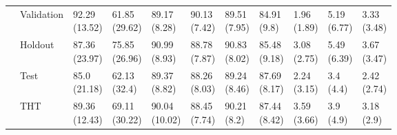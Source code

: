 \begin{table}
\begin{tabular}{lllllllllll}
       & Validation &  \makecell{92.29\\(13.52)} &  \makecell{61.85\\(29.62)} &   \makecell{89.17\\(8.28)} &  \makecell{90.13\\(7.42)} &  \makecell{89.51\\(7.95)} &   \makecell{84.91\\(9.8)} &      \makecell{1.96\\(1.89)} &  \makecell{5.19\\(6.77)} &  \makecell{3.33\\(3.48)} \\
       & Holdout &  \makecell{87.36\\(23.97)} &  \makecell{75.85\\(26.96)} &   \makecell{90.99\\(8.93)} &  \makecell{88.78\\(7.87)} &  \makecell{90.83\\(8.02)} &  \makecell{85.48\\(9.18)} &      \makecell{3.08\\(2.75)} &  \makecell{5.49\\(6.39)} &  \makecell{3.67\\(3.47)} \\
       & Test &   \makecell{85.0\\(21.18)} &   \makecell{62.13\\(32.4)} &   \makecell{89.37\\(8.82)} &  \makecell{88.26\\(8.03)} &  \makecell{89.24\\(8.46)} &  \makecell{87.69\\(8.17)} &      \makecell{2.24\\(3.15)} &    \makecell{3.4\\(4.4)} &  \makecell{2.42\\(2.74)} \\
       & THT &  \makecell{89.36\\(12.43)} &  \makecell{69.11\\(30.22)} &  \makecell{90.04\\(10.02)} &  \makecell{88.45\\(7.74)} &   \makecell{90.21\\(8.2)} &  \makecell{87.44\\(8.42)} &      \makecell{3.59\\(3.66)} &    \makecell{3.9\\(4.9)} &   \makecell{3.18\\(2.9)} \\
\bottomrule
\end{tabular}
\end{table}
